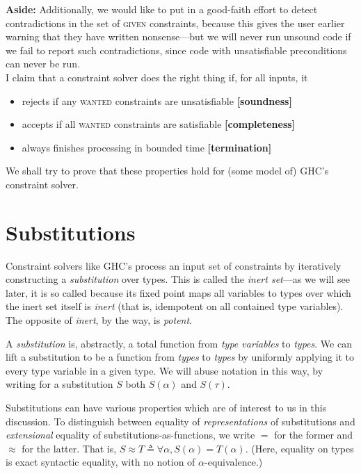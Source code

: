\documentclass[10pt, letterpaper, oneside]{article}
\begin{document}
\textbf{Aside:} Additionally, we would like to put in a good-faith effort to detect contradictions in the set of \textsc{given} constraints, because this gives the user earlier warning that they have written nonsense---but we will never run unsound code if we fail to report such contradictions, since code with unsatisfiable preconditions can never be run.\\

I claim that a constraint solver does the right thing if, for all inputs, it
\begin{itemize}
\item rejects if any \textsc{wanted} constraints are unsatisfiable \textbf{[soundness]}
\item accepts if all \textsc{wanted} constraints are satisfiable \textbf{[completeness]}
\item always finishes processing in bounded time \textbf{[termination]}
\end{itemize}

We shall try to prove that these properties hold for (some model of) GHC's constraint solver.

\section{Substitutions}

Constraint solvers like GHC's process an input set of constraints by iteratively constructing a \emph{substitution} over types. This is called the \emph{inert set}---as we will see later, it is so called because its fixed point maps all variables to types over which the inert set itself is \emph{inert} (that is, idempotent on all contained type variables). The opposite of \emph{inert}, by the way, is \emph{potent}.

A \emph{substitution} is, abstractly, a total function from \emph{type variables} to \emph{types}. We can lift a substitution to be a function from \emph{types} to \emph{types} by uniformly applying it to every type variable in a given type. We will abuse notation in this way, by writing for a substitution \(S\) both \(S(\alpha)\) and \(S(\tau)\).

Substitutions can have various properties which are of interest to us in this discussion. To distinguish between equality of \emph{representations} of substitutions and \emph{extensional} equality of substitutions-as-functions, we write \(=\) for the former and \(\approx\) for the latter. That is, \(S \approx T \triangleq \forall \alpha, S(\alpha) = T(\alpha)\). (Here, equality on types is exact syntactic equality, with no notion of \(\alpha\)-equivalence.)
\end{document}
